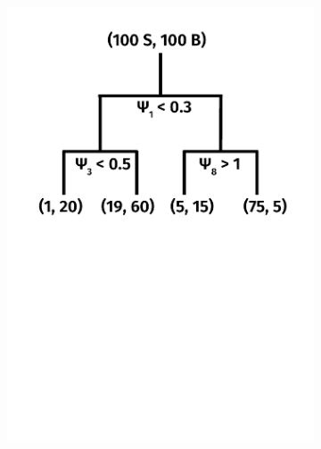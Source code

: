 \begin{figure}[]
\begin{center}
\begin{subfigure}[t]{0.32\textwidth}
            \includegraphics[width=\textwidth]{figures/toptagging/bdt/tree1.pdf}
            \caption{}
        \end{subfigure}
        \begin{subfigure}[t]{0.32\textwidth}

\end{subfigure}
\end{center}
\end{figure}
